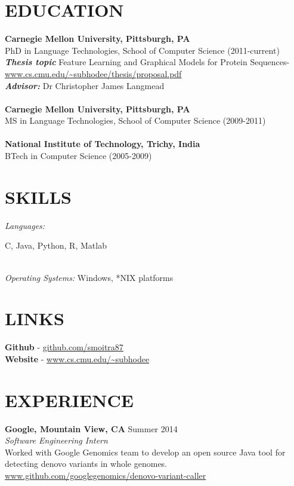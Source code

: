 \documentclass[margin]{res}
\begin{document}
\begin{resume}
 
\section{EDUCATION}\textbf{Carnegie Mellon University, Pittsburgh, PA} \\
					PhD in Language Technologies, School of Computer Science (2011-current) \\
					\textbf{	\textit{Thesis topic}} Feature Learning and Graphical Models for Protein Sequences- \\
					\url{www.cs.cmu.edu/~subhodee/thesis/proposal.pdf} \\
\textbf{	\textit{Advisor:}} Dr Christopher James Langmead \\
					\\					
  \textbf{Carnegie Mellon University, Pittsburgh, PA} \\
					MS in Language Technologies, School of Computer Science (2009-2011) \\
					\\					
 					\textbf{National Institute of Technology, Trichy, India} \\
					BTech in Computer Science (2005-2009) 		


\section{SKILLS} {\sl Languages:}  \parbox[position=center]{4.5in}{C, Java, Python, R, Matlab}\\
                {\sl Operating Systems:} Windows, *NIX platforms

\section{LINKS} \textbf{Github} - \url{github.com/smoitra87}\\
		  \textbf{Website} - \url{www.cs.cmu.edu/~subhodee}
  
\section{EXPERIENCE} 
                {\textbf{Google, Mountain View, CA } } \hfill Summer 2014 \\
                {\sl Software Engineering Intern } \\
		Worked with Google Genomics team to develop an open source Java tool for detecting denovo variants in whole genomes. \\
			 \url{www.github.com/googlegenomics/denovo-variant-caller}


\end{resume}
\end{document}

